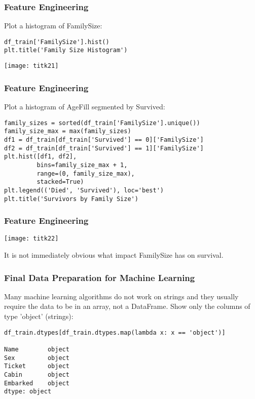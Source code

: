 \begin{frame}[fragile]\frametitle{Feature Engineering}
Plot a histogram of FamilySize:
\begin{lstlisting}
df_train['FamilySize'].hist()
plt.title('Family Size Histogram')
\end{lstlisting}
\begin{center}
\texttt{[image: titk21]}
\end{center}
\end{frame}

\begin{frame}[fragile]\frametitle{Feature Engineering}
Plot a histogram of AgeFill segmented by Survived:
\begin{lstlisting}
family_sizes = sorted(df_train['FamilySize'].unique())
family_size_max = max(family_sizes)
df1 = df_train[df_train['Survived'] == 0]['FamilySize']
df2 = df_train[df_train['Survived'] == 1]['FamilySize']
plt.hist([df1, df2], 
         bins=family_size_max + 1, 
         range=(0, family_size_max), 
         stacked=True)
plt.legend(('Died', 'Survived'), loc='best')
plt.title('Survivors by Family Size')
\end{lstlisting}

\end{frame}

\begin{frame}[fragile]\frametitle{Feature Engineering}
\begin{center}
\texttt{[image: titk22]}
\end{center}
It is not immediately obvious what impact FamilySize has on survival.
\end{frame}

\begin{frame}[fragile]\frametitle{Final Data Preparation for Machine Learning}
Many machine learning algorithms do not work on strings and they usually require the data to be in an array, not a DataFrame. Show only the columns of type 'object' (strings):
\begin{lstlisting}
df_train.dtypes[df_train.dtypes.map(lambda x: x == 'object')]

Name        object
Sex         object
Ticket      object
Cabin       object
Embarked    object
dtype: object
\end{lstlisting}
\end{frame}

